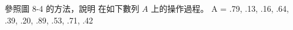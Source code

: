 \startEXERCISE
參照圖 8-4 的方法，說明  在如下數列 $A$ 上的操作過程。
\startformula
A = \langle .79, .13, .16, .64, .39, .20, .89, .53, .71, .42 \rangle
\stopformula
\stopEXERCISE

\startANSWER
\externalfigure[e8_4_1-1]
\stopANSWER

